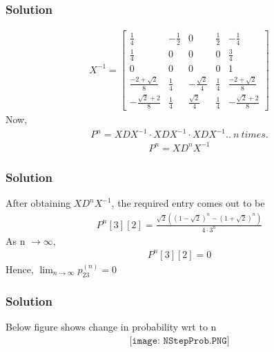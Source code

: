 \documentclass{beamer}
\begin{document}
\begin{frame}
\frametitle{Solution}
\begin{align}
    X^{-1} = \left[\begin{array}{ccccc}\frac{1}{4} & - \frac{1}{2} & 0 & \frac{1}{2} & - \frac{1}{4}\\\frac{1}{4} & 0 & 0 & 0 & \frac{3}{4}\\0 & 0 & 0 & 0 & 1\\\frac{-2 + \sqrt{2}}{8} & \frac{1}{4} & - \frac{\sqrt{2}}{4} & \frac{1}{4} & \frac{-2 + \sqrt{2}}{8}\\- \frac{\sqrt{2} + 2}{8} & \frac{1}{4} & \frac{\sqrt{2}}{4} & \frac{1}{4} & - \frac{\sqrt{2} + 2}{8}\end{array}\right]
\end{align}
Now,
\begin{align}
    P^{n} = X D X^{-1} \cdot X D X^{-1} \cdot X D X^{-1}..\ n\ times.
\end{align}
\begin{align}
    P^{n} = X D^{n}X^{-1}
\end{align}
\end{frame}

\begin{frame}
\frametitle{Solution}
After obtaining $X D^{n}X^{-1}$, the required entry comes out to be
\begin{align}
    P^{n}[3][2] = \frac{\sqrt{2}\left(\left(1 - \sqrt{2}\right)^{n} - \left(1 + \sqrt{2}\right)^{n}\right)}{4\cdot3^{n}} 
\end{align}
As n $\rightarrow\infty$,
\begin{align}
    P^{n}[3][2] = 0
\end{align}
Hence,
  $\lim _{n \rightarrow \infty} p_{23}^{(n)} = 0 $
\end{frame}

\begin{frame}
\frametitle{Solution}
Below figure shows change in probability wrt to n 
\begin{align}
    \texttt{[image: NStepProb.PNG]}
\end{align}
\end{frame}
\end{document}
